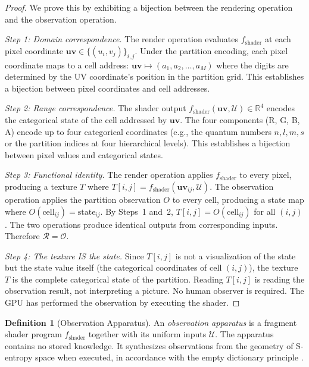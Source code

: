 \documentclass[11pt,twocolumn,a4paper]{article}
\theoremstyle{definition}
\newtheorem{definition}[theorem]{Definition}
\theoremstyle{remark}
\begin{document}
\begin{proof}
We prove this by exhibiting a bijection between the rendering operation and the observation operation.

\emph{Step 1: Domain correspondence.} The render operation evaluates $f_{\mathrm{shader}}$ at each pixel coordinate $\mathbf{uv} \in \{(u_i, v_j)\}_{i,j}$. Under the partition encoding, each pixel coordinate maps to a cell address: $\mathbf{uv} \mapsto (a_1, a_2, \ldots, a_M)$ where the digits are determined by the UV coordinate's position in the partition grid. This establishes a bijection between pixel coordinates and cell addresses.

\emph{Step 2: Range correspondence.} The shader output $f_{\mathrm{shader}}(\mathbf{uv}, \mathcal{U}) \in \mathbb{R}^4$ encodes the categorical state of the cell addressed by $\mathbf{uv}$. The four components (R, G, B, A) encode up to four categorical coordinates (e.g., the quantum numbers $n, l, m, s$ or the partition indices at four hierarchical levels). This establishes a bijection between pixel values and categorical states.

\emph{Step 3: Functional identity.} The render operation applies $f_{\mathrm{shader}}$ to every pixel, producing a texture $T$ where $T[i,j] = f_{\mathrm{shader}}(\mathbf{uv}_{ij}, \mathcal{U})$. The observation operation applies the partition observation $O$ to every cell, producing a state map where $O(\text{cell}_{ij}) = \text{state}_{ij}$. By Steps~1 and~2, $T[i,j] = O(\text{cell}_{ij})$ for all $(i,j)$. The two operations produce identical outputs from corresponding inputs. Therefore $\mathcal{R} = \mathcal{O}$.

\emph{Step 4: The texture IS the state.} Since $T[i,j]$ is not a visualization of the state but the state value itself (the categorical coordinates of cell $(i,j)$), the texture $T$ is the complete categorical state of the partition. Reading $T[i,j]$ is reading the observation result, not interpreting a picture. No human observer is required. The GPU has performed the observation by executing the shader.
\end{proof}

\begin{definition}[Observation Apparatus]
\label{def:obs_apparatus}
An \emph{observation apparatus} is a fragment shader program $f_{\mathrm{shader}}$ together with its uniform inputs $\mathcal{U}$. The apparatus contains no stored knowledge. It synthesizes observations from the geometry of S-entropy space when executed, in accordance with the empty dictionary principle \citep{sachikonye2025b, sachikonye2025c}.
\end{definition}
\end{document}
